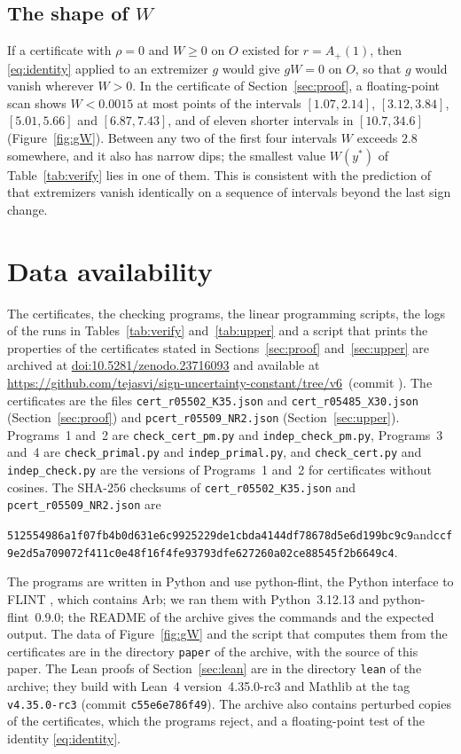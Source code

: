 \documentclass[11pt]{amsart}
\theoremstyle{definition}
\theoremstyle{remark}
\numberwithin{equation}{section}
\newcommand{\Ap}{A_+(1)}
\newcommand{\certU}{\texttt{cert\_r05502\_K35.json}}
\newcommand{\shaU}{\texttt{512554986a1f07fb4b0d631e6c9925229de1cbda4144df78678d5e6d199bc9c9}}
\newcommand{\certX}{\texttt{cert\_r05485\_X30.json}}
\newcommand{\certP}{\texttt{pcert\_r05509\_NR2.json}}
\newcommand{\shaP}{\texttt{ccf9e2d5a709072f411c0e48f16f4fe93793dfe627260a02ce88545f2b6649c4}}
\newcommand{\shapeThr}{0.0015}
\newcommand{\shapeInt}{$[1.07,2.14]$, $[3.12,3.84]$, $[5.01,5.66]$ and $[6.87,7.43]$}
\newcommand{\shapeHigh}{2.8}
\newcommand{\DOIsupp}{10.5281/zenodo.23716093}
\def\RepoCommit{}
\newcommand{\RepoLink}{\url{https://github.com/tejasvi/sign-uncertainty-constant/tree/v6}\ifx\RepoCommit\empty\else\ (commit \texttt{\RepoCommit})\fi}
\begin{document}
\subsection*{The shape of \texorpdfstring{$W$}{W}} If a certificate with $\rho=0$ and $W\ge0$ on $O$ existed for $r=\Ap$, then \eqref{eq:identity} applied to an extremizer $g$ would give $gW=0$ on $O$, so that $g$ would vanish wherever $W>0$. In the certificate of Section~\ref{sec:proof}, a floating-point scan shows $W<\shapeThr$ at most points of the intervals \shapeInt, and of eleven shorter intervals in $[10.7,34.6]$ (Figure~\ref{fig:gW}). Between any two of the first four intervals $W$ exceeds $\shapeHigh$ somewhere, and it also has narrow dips; the smallest value $W(y^*)$ of Table~\ref{tab:verify} lies in one of them. This is consistent with the prediction of \cite[Conjecture~1.7]{GOR23} that extremizers vanish identically on a sequence of intervals beyond the last sign change.

\section*{Data availability}
The certificates, the checking programs, the linear programming scripts, the logs of the runs in Tables~\ref{tab:verify} and~\ref{tab:upper} and a script that prints the properties of the certificates stated in Sections~\ref{sec:proof} and~\ref{sec:upper} are archived at \href{https://doi.org/\DOIsupp}{doi:\DOIsupp} and available at \RepoLink. The certificates are the files \certU{} and \certX{} (Section~\ref{sec:proof}) and \certP{} (Section~\ref{sec:upper}). Programs~1 and~2 are \texttt{check\_cert\_pm.py} and \texttt{indep\_check\_pm.py}, Programs~3 and~4 are \texttt{check\_primal.py} and \texttt{indep\_primal.py}, and \texttt{check\_cert.py} and \texttt{indep\_check.py} are the versions of Programs~1 and~2 for certificates without cosines. The SHA-256 checksums of \certU{} and \certP{} are
\begin{center}\footnotesize\shaU\quad and\quad\shaP.\end{center}
The programs are written in Python and use python-flint, the Python interface to FLINT \cite{FLINT}, which contains Arb; we ran them with Python~3.12.13 and python-flint~0.9.0; the README of the archive gives the commands and the expected output. The data of Figure~\ref{fig:gW} and the script that computes them from the certificates are in the directory \texttt{paper} of the archive, with the source of this paper. The Lean proofs of Section~\ref{sec:lean} are in the directory \texttt{lean} of the archive; they build with Lean~4 version~4.35.0-rc3 and Mathlib at the tag \texttt{v4.35.0-rc3} (commit \texttt{c55e6e786f49}). The archive also contains perturbed copies of the certificates, which the programs reject, and a floating-point test of the identity \eqref{eq:identity}.
\end{document}

